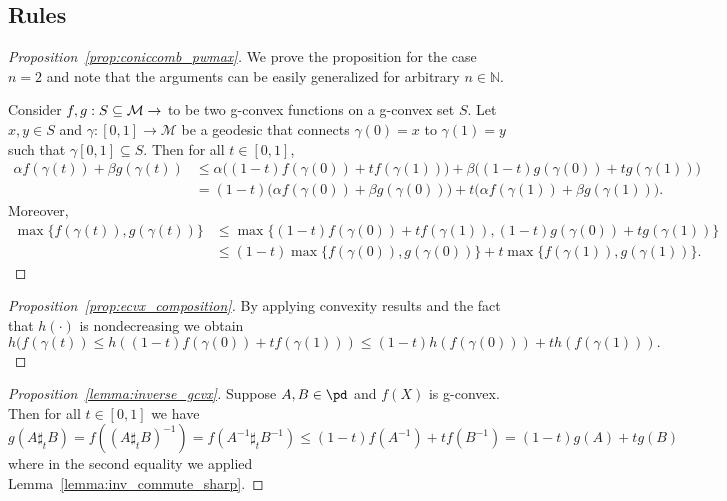 \documentclass[twoside,11pt]{article}
\begin{document}
\subsection{Rules}\label{app:gcvx_rules}
\begin{proof}[Proposition~\ref{prop:coniccomb_pwmax}]

We prove the proposition for the case $n=2$ and note that the arguments can be easily generalized for arbitrary $n \in \mathbb{N}$. 

Consider $f,g: S \subseteq \mathcal{M} \to \real$ to be two g-convex functions on a g-convex set $S$. Let $x,y \in S$ and $\gamma:[0,1] \to \mathcal{M}$ be a geodesic that connects $\gamma(0) = x$ to $\gamma(1) = y$ such that $\gamma[0,1] \subseteq S$. Then for all $t \in [0,1]$,
\begin{align*}
    \alpha f(\gamma(t)) + \beta g(\gamma(t)) &\leq \alpha \bigg( (1-t)f(\gamma(0)) + t f(\gamma(1))\bigg) + \beta \bigg( (1-t)g(\gamma(0)) + t g(\gamma(1))\bigg)
    \\&= \left(1-t\right)\big(\alpha f(\gamma(0)) + \beta g(\gamma(0)) \big) + t \big(\alpha f(\gamma(1)) + \beta g(\gamma(1))\big).
\end{align*}
Moreover, 
\begin{align*}
    \max \big\{f(\gamma(t)), g(\gamma(t)) \big\} & \leq \max \big\{(1-t)f(\gamma(0)) + t f(\gamma(1)), (1-t)g(\gamma(0)) + t g(\gamma(1))  \big\}
    \\&\leq (1-t) \max\big \{f(\gamma(0)),g(\gamma(0))  \big\} + t \max\big\{f(\gamma(1)), g(\gamma(1))\big \}.
\end{align*}
\end{proof}

\begin{proof}[Proposition~\ref{prop:ecvx_composition}]
By applying convexity results and the fact that $h(\cdot)$ is nondecreasing we obtain
\[
h(f(\gamma(t)) \leq h \left((1-t)f(\gamma(0)) + t f(\gamma(1))\right) \leq (1-t)h(f(\gamma(0))) + t h(f(\gamma(1))).
\]
\end{proof}


\begin{proof}[Proposition~\ref{lemma:inverse_gcvx}]
    Suppose $A, B \in \pd$ and $f(X)$ is g-convex. Then for all $t \in [0,1]$ we have 
    \[
    g(A \sharp_t B) = f\left( (A \sharp_t B)^{-1}\right) = f(A^{-1} \sharp_t B^{-1}) \leq \left(1-t\right)f\left(A^{-1}\right) + t f\left(B^{-1}\right) = (1-t)g(A) + tg(B)
    \]
    where in the second equality we applied Lemma~\ref{lemma:inv_commute_sharp}.
    
\end{proof}
\end{document}
